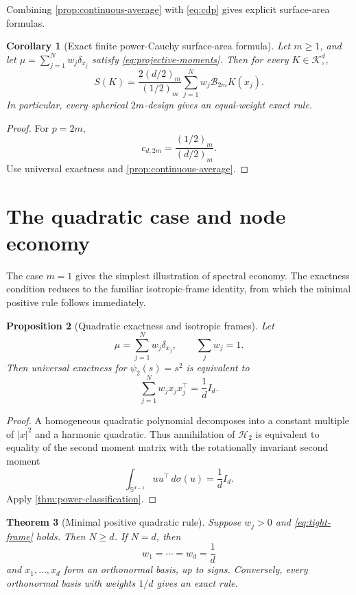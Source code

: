 \documentclass[12pt,a4paper]{article}
\newcommand{\Sph}{\mathbb S}
\newcommand{\K}{\mathcal K}
\newcommand{\Harm}{\mathcal H}
\newcommand{\cB}{\mathcal B}
\theoremstyle{plain}
\newtheorem{theorem}{Theorem}[section]
\newtheorem{proposition}[theorem]{Proposition}
\newtheorem{corollary}[theorem]{Corollary}
\theoremstyle{definition}
\begin{document}
Combining \cref{prop:continuous-average} with \eqref{eq:cdp} gives explicit surface-area formulas.

\begin{corollary}[Exact finite power-Cauchy surface-area formula]\label{cor:surface-power}
Let $m\ge1$, and let $\mu=\sum_{j=1}^Nw_j\delta_{x_j}$ satisfy \eqref{eq:projective-moments}.  Then for every $K\in\K^d_\circ$,
\begin{equation}\label{eq:surface-power}
 \boxed{
 S(K)
 =\frac{2(d/2)_m}{(1/2)_m}
 \sum_{j=1}^Nw_j\cB_{2m}K(x_j).
 }
\end{equation}
In particular, every spherical $2m$-design gives an equal-weight exact rule.
\end{corollary}

\begin{proof}
For $p=2m$,
\[
 c_{d,2m}=\frac{(1/2)_m}{(d/2)_m}.
\]
Use universal exactness and \cref{prop:continuous-average}.
\end{proof}

\section{The quadratic case and node economy}

The case $m=1$ gives the simplest illustration of spectral economy. The exactness condition reduces to the familiar isotropic-frame identity, from which the minimal positive rule follows immediately.

\begin{proposition}[Quadratic exactness and isotropic frames]\label{prop:quad-frame}
Let
\[
 \mu=\sum_{j=1}^Nw_j\delta_{x_j},\qquad \sum_jw_j=1.
\]
Then universal exactness for $\psi_2(s)=s^2$ is equivalent to
\begin{equation}\label{eq:tight-frame}
 \sum_{j=1}^Nw_jx_jx_j^\top=\frac1dI_d.
\end{equation}
\end{proposition}

\begin{proof}
A homogeneous quadratic polynomial decomposes into a constant multiple of $|x|^2$ and a harmonic quadratic.  Thus annihilation of $\Harm_2$ is equivalent to equality of the second moment matrix with the rotationally invariant second moment
\[
 \int_{\Sph^{d-1}}uu^\top\,d\sigma(u)=\frac1dI_d.
\]
Apply \cref{thm:power-classification}.
\end{proof}

\begin{theorem}[Minimal positive quadratic rule]\label{thm:minimal-quadratic}
Suppose $w_j>0$ and \eqref{eq:tight-frame} holds.  Then $N\ge d$.  If $N=d$, then
\[
 w_1=\cdots=w_d=\frac1d
\]
and $x_1,\ldots,x_d$ form an orthonormal basis, up to signs.  Conversely, every orthonormal basis with weights $1/d$ gives an exact rule.
\end{theorem}
\end{document}

